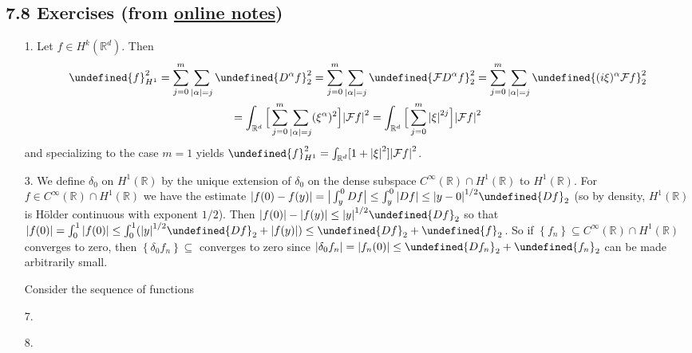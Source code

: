 \documentclass[11pt,leqno]{article}
\theoremstyle{plain}
\theoremstyle{definition}
\numberwithin{equation}{section}
\numberwithin{lem}{section}
\newcommand{\cbr}[1]{\left\{#1\right\}}
\let\norm\undefined %
\DeclarePairedDelimiter\norm{\lVert}{\rVert}
\begin{document}
\subsection*{7.8 Exercises (from \href{https://users.oden.utexas.edu/~arbogast/appMath08c.pdf}{online notes})}
\begin{enumerate}
    \item[1.] Let $f\in H^k(\mathbb R^d)$. Then 
    \begin{multline*}
        \norm{f}_{H^1}^2 = \sum_{j=0}^m\sum_{\abs{\alpha} = j}\norm{D^\alpha f}_2^2 = \sum_{j=0}^m\sum_{\abs{\alpha} = j}\norm{\mathcal FD^\alpha f}_2^2 = \sum_{j=0}^m\sum_{\abs{\alpha} = j}\norm{(i\xi)^\alpha \mathcal F f}_2^2 \\ = \int_{\mathbb R^d}\Big[\sum_{j=0}^m\sum_{\abs{\alpha} = j}(\xi^\alpha)^2\Big]\abs{\mathcal Ff}^2 = \int_{\mathbb R^d}\Big[\sum_{j=0}^m\abs{\xi}^{2j}\Big]\abs{\mathcal Ff}^2
    \end{multline*} and specializing to the case $m = 1$ yields $\norm{f}_{H^1}^2 = \int_{\mathbb R^d}[1+\abs{\xi}^{2}]\abs{\mathcal Ff}^2$.
    \item[3.] We define $\delta_0$ on $H^1(\mathbb R)$ by the unique extension of $\delta_0$ on the dense subspace $C^\infty(\mathbb R)\cap H^1(\mathbb R)$ to $H^1(\mathbb R)$. For $f\in C^\infty(\mathbb R)\cap H^1(\mathbb R)$ we have the estimate $\abs{f(0)-f(y)} = \big|\int_y^0Df\big|\leq \int_y^0\abs{Df}\leq \abs{y-0}^{1/2}\norm{Df}_2$ (so by density, $H^1(\mathbb R)$ is H\"older continuous with exponent $1/2$). Then $\abs{f(0)} - \abs{f(y)}\leq \abs{y}^{1/2}\norm{Df}_2$ so that $\abs{f(0)} = \int_0^1\abs{f(0)}\leq \int_0^1(\abs{y}^{1/2}\norm{Df}_2 + \abs{f(y)})\leq \norm{Df}_2 + \norm{f}_2$. So if $\cbr{f_n}\subseteq C^\infty(\mathbb R)\cap H^1(\mathbb R)$ converges to zero, then $\cbr{\delta_0f_n}\subseteq$ converges to zero since $\abs{\delta_0f_n} = \abs{f_n(0)}\leq \norm{Df_n}_2 + \norm{f_n}_2$ can be made arbitrarily small.
    
    Consider the sequence of functions 
    \item[7.] 
    \item[8.] 
\end{enumerate}
\end{document}
